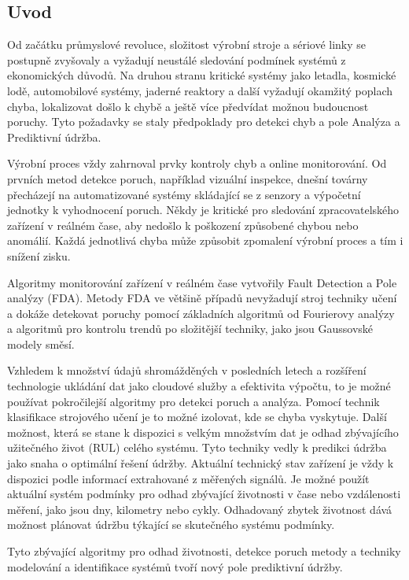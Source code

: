 \subsection*{Uvod}

Od začátku průmyslové revoluce, složitost
výrobní stroje a sériové linky se postupně zvyšovaly a vyžadují
neustálé sledování podmínek systémů z ekonomických důvodů.
Na druhou stranu kritické systémy jako letadla, kosmické lodě,
automobilové systémy, jaderné reaktory a další vyžadují okamžitý poplach
chyba, lokalizovat došlo k chybě a ještě více předvídat možnou budoucnost
poruchy. Tyto požadavky se staly předpoklady pro detekci chyb
a pole Analýza a Prediktivní údržba.

Výrobní proces vždy zahrnoval prvky kontroly chyb a online
monitorování. Od prvních metod detekce poruch, například vizuální
inspekce, dnešní továrny přecházejí na automatizované systémy skládající se z
senzory a výpočetní jednotky k vyhodnocení poruch. Někdy je
kritické pro sledování zpracovatelského zařízení v reálném čase, aby nedošlo k poškození
způsobené chybou nebo anomálií. Každá jednotlivá chyba může způsobit zpomalení
výrobní proces a tím i snížení zisku.

Algoritmy monitorování zařízení v reálném čase vytvořily Fault Detection a
Pole analýzy (FDA). Metody FDA ve většině případů nevyžadují stroj
techniky učení a dokáže detekovat poruchy pomocí základních algoritmů
od Fourierovy analýzy a algoritmů pro kontrolu trendů po složitější
techniky, jako jsou Gaussovské modely směsí.

Vzhledem k množství údajů shromážděných v posledních letech a rozšíření
technologie ukládání dat jako cloudové služby a efektivita výpočtu, to
je možné používat pokročilejší algoritmy pro detekci poruch a
analýza. Pomocí technik klasifikace strojového učení je to možné
izolovat, kde se chyba vyskytuje. Další možnost, která se stane
k dispozici s velkým množstvím dat je odhad zbývajícího užitečného
život (RUL) celého systému. Tyto techniky vedly k predikci
údržba jako snaha o optimální řešení údržby. Aktuální
technický stav zařízení je vždy k dispozici podle informací
extrahované z měřených signálů. Je možné použít aktuální systém
podmínky pro odhad zbývající životnosti v čase nebo vzdálenosti
měření, jako jsou dny, kilometry nebo cykly. Odhadovaný zbytek
životnost dává možnost plánovat údržbu týkající se skutečného systému
podmínky.

Tyto zbývající algoritmy pro odhad životnosti, detekce poruch
metody a techniky modelování a identifikace systémů tvoří nový
pole prediktivní údržby.

